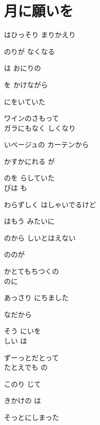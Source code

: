 \section{ 月に願いを}
\large{

はひっそり まりかえり

のりが なくなる

は おにりの

を かけながら

にをいていた

ワインのさもって
\\

ガラにもなく しくなり

いベージュの カーテンから

かすかにれる が

のを らしていた
\\

びは も

わらずしく はしゃいでるけど

はもう みたいに

のから しいとはえない

ののが

かとてもちつくの
\\

のに

あっさり にちました

なだから

そう にいを
\\

しい は

ずーっとだとって
\\

たとえでも の

このり じて

きかけの は

そっとにしまった

}